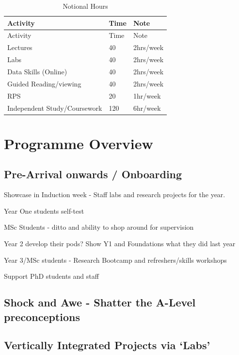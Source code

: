 \documentclass[
  11pt,
  letterpaper,
  oneside,
  open=any]{scrbook}
\begin{document}
\begin{longtable}[]{@{}lll@{}}
\caption{Notional Hours}\tabularnewline
\toprule()
Activity & Time & Note \\
\midrule()
\endfirsthead
\toprule()
Activity & Time & Note \\
\midrule()
\endhead
Lectures & 40 & 2hrs/week \\
Labs & 40 & 2hrs/week \\
Data Skills (Online) & 40 & 2hrs/week \\
Guided Reading/viewing & 40 & 2hrs/week \\
RPS & 20 & 1hr/week \\
Independent Study/Coursework & 120 & 6hr/week \\
\bottomrule()
\end{longtable}

\hypertarget{programme-overview}{%
\section{Programme Overview}\label{programme-overview}}

\hypertarget{pre-arrival-onwards-onboarding}{%
\subsection{Pre-Arrival onwards /
Onboarding}\label{pre-arrival-onwards-onboarding}}

Showcase in Induction week - Staff labs and research projects for the
year.

Year One students self-test

MSc Students - ditto and ability to shop around for supervision

Year 2 develop their pods? Show Y1 and Foundations what they did last
year

Year 3/MSc students - Research Bootcamp and refreshers/skills workshops

Support PhD students and staff

\hypertarget{shock-and-awe---shatter-the-a-level-preconceptions}{%
\subsection{Shock and Awe - Shatter the A-Level
preconceptions}\label{shock-and-awe---shatter-the-a-level-preconceptions}}

\hypertarget{vertically-integrated-projects-via-labs}{%
\subsection{Vertically Integrated Projects via
`Labs'}\label{vertically-integrated-projects-via-labs}}
\end{document}
